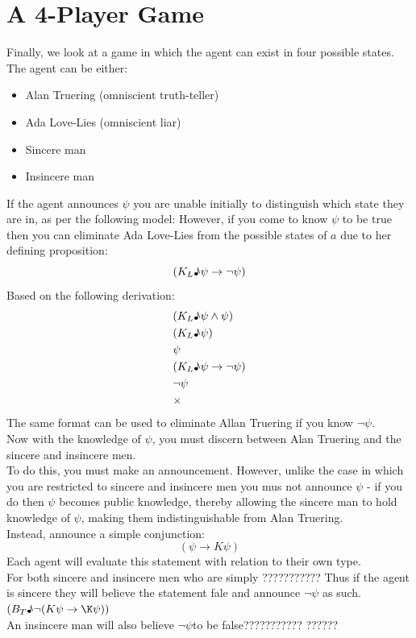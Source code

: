 \documentclass[12pt, titlepage, twoside, a4paper]{report}
\begin{document}
\section{A 4-Player Game}
Finally, we look at a game in which the agent can exist in four possible states. The agent can be either:
\begin{itemize}
\item Alan Truering (omniscient truth-teller)
\item Ada Love-Lies (omniscient liar)
\item Sincere man
\item Insincere man
\end{itemize}
If the agent announces $\psi$ you are unable initially to distinguish which state they are in, as per the following model:
However, if you come to know $\psi$ to be true then you can eliminate Ada Love-Lies from the possible states of $a$ due to her defining proposition: 
$$(K_L \text{\textmusicalnote} \psi \to \neg \psi)$$
Based on the following derivation:
\begin{align*}
&(K_L \text{\textmusicalnote} \psi \wedge \psi )\\
&(K_L \text{\textmusicalnote} \psi )\\
&\psi \\
&(K_L \text{\textmusicalnote} \psi \to \neg \psi )\\
&\neg \psi \\
&\times
\end{align*}
The same format can be used to eliminate Allan Truering if you know $\neg \psi$.\\
Now with the knowledge of $\psi$, you must discern between Alan Truering and the sincere and insincere men.\\
To do this, you must make an announcement. However, unlike the case in which you are restricted to sincere and insincere men you mus not announce $\psi$ - if you do then $\psi$ becomes public knowledge, thereby allowing the sincere man to hold knowledge of $\psi$, making them indistinguishable from Alan Truering.\\
Instead, announce a simple conjunction:
$$(\psi \to K\psi)$$ 
Each agent will evaluate this statement with relation to their own type.\\
For both sincere and insincere men who are simply ???????????
Thus if the agent is sincere they will believe the statement fale and announce $\neg \psi$ as such. $(B_T \text{\textmusicalnote} \neg (K \psi \to \K \psi))$\\
An insincere man will also believe $\neg \psi$to be false???????????
??????
\end{document}
